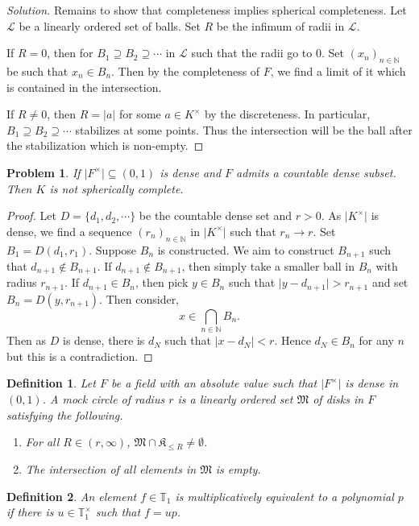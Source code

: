 \documentclass[8pt]{article}
\numberwithin{equation}{section}
\newenvironment{solution}{\begin{proof}[Solution]}{\end{proof}}
\newtheorem{definition}{Definition}[section]
\newtheorem{problem}{Problem}[section]
\newcommand{\N}[0]{\mathbb{N}}
\newcommand{\T}[0]{\mathbb{T}}
\newcommand{\ab}[1]{\vert #1 \vert}
\begin{document}
\begin{solution}
  Remains to show that completeness implies spherical completeness. Let $\mathcal{L}$ be a linearly ordered set of balls. Set $R$ be the infimum of radii in $\mathcal{L}$.
  \par If $R=0$, then for $B_1\supseteq B_2\supseteq\cdots$ in $\mathcal{L}$ such that the radii go to $0$. Set $(x_n)_{n\in\N}$ be such that $x_n\in B_n$. Then by the completeness of $F$, we find a limit of it which is contained in the intersection.
  \par If $R\not=0$, then $R = \ab{a}$ for some $a\in K^\times $ by the discreteness. In particular, $B_1\supseteq B_2\supseteq\cdots$ stabilizes at some points. Thus the intersection will be the ball after the stabilization which is non-empty.
\end{solution}
\begin{problem}
  If $\ab{F^\times}\subseteq(0,1)$ is dense and $F$ admits a countable dense subset. Then $K$ is not spherically complete.
\end{problem}
\begin{proof}
  Let $D = \{d_1,d_2,\cdots\}$ be the countable dense set and $r>0$. As $\ab{K^\times}$ is dense, we find a sequence $(r_n)_{n\in \N}$ in $\ab{K^\times}$ such that $r_n\to r$. Set $B_1 = D(d_1,r_1)$. Suppose $B_n$ is constructed. We aim to construct $B_{n+1}$ such that $d_{n+1}\not\in B_{n+1}$.
  If $d_{n+1}\not\in B_{n+1}$, then simply take a smaller ball in $B_{n}$ with radius $r_{n+1}$. If $d_{n+1}\in B_{n}$, then pick $y\in B_n$ such that $\ab{y-d_{n+1}}>r_{n+1}$ and set $B_n = D(y,r_{n+1})$.
  Then consider,
  \begin{equation*}
    x\in \bigcap_{n\in\N}B_n.
  \end{equation*}
  Then as $D$ is dense, there is $d_N$ such that $\ab{x-d_N}<r$. Hence $d_N\in B_n$ for any $n$ but this is a contradiction.
\end{proof}
\begin{definition}
  Let $F$ be a field with an absolute value such that $\ab{F^\times}$ is dense in $(0,1)$. A mock circle of radius $r$ is a linearly ordered set $\mathfrak{M}$ of disks in $F$ satisfying the following.
  \begin{enumerate}
    \item For all $R\in (r,\infty)$, $\mathfrak{M}\cap\mathfrak{K}_{\leq R}\not=\emptyset$.
    \item The intersection of all elements in $\mathfrak{M}$ is empty.
  \end{enumerate}
\end{definition}
\begin{definition}
  An element $f\in \T_1$ is multiplicatively equivalent to a polynomial $p$ if there is $u\in\T_1^\times$ such that $f = up$.
\end{definition}
\end{document}
